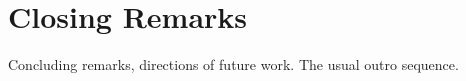 \section{Closing Remarks} \label{sec:Conclusion}

Concluding remarks, directions of future work.
The usual outro sequence.